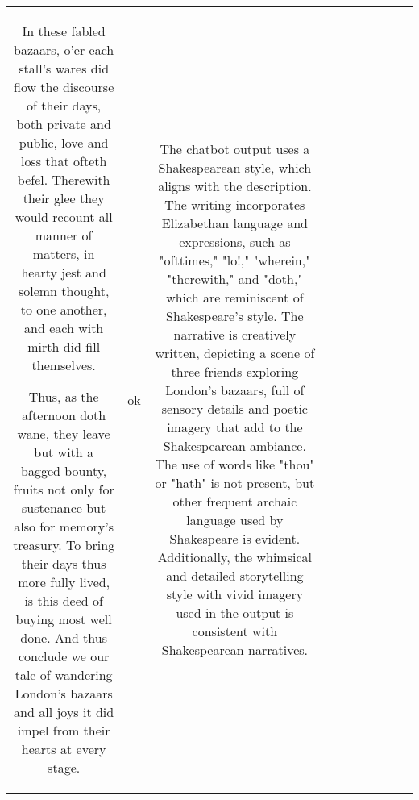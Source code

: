 \begin{table}[h!]
\begin{tabular}{|c|c|c|c|c|c|c|c|c|c|}
In these fabled bazaars, o’er each stall’s wares did flow the discourse of their days, both private and public, love and loss that ofteth befel. Therewith their glee they would recount all manner of matters, in hearty jest and solemn thought, to one another, and each with mirth did fill themselves.

Thus, as the afternoon doth wane, they leave but with a bagged bounty, fruits not only for sustenance but also for memory's treasury. To bring their days thus more fully lived, is this deed of buying most well done. And thus conclude we our tale of wandering London's bazaars and all joys it did impel from their hearts at every stage. & ok & The chatbot output uses a Shakespearean style, which aligns with the description. The writing incorporates Elizabethan language and expressions, such as "ofttimes," "lo!," "wherein," "therewith," and "doth," which are reminiscent of Shakespeare's style. The narrative is creatively written, depicting a scene of three friends exploring London's bazaars, full of sensory details and poetic imagery that add to the Shakespearean ambiance. The use of words like "thou" or "hath" is not present, but other frequent archaic language used by Shakespeare is evident. Additionally, the whimsical and detailed storytelling style with vivid imagery used in the output is consistent with Shakespearean narratives. 


\end{tabular}
\end{table}
